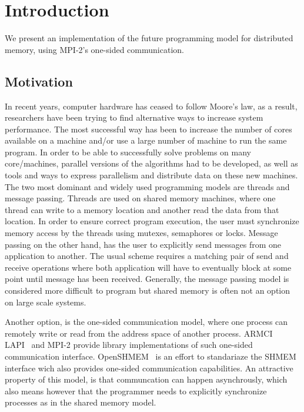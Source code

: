 \chapter{Introduction}
We present an implementation of the future programming model for distributed memory,
using MPI-2's one-sided communication.


\section{Motivation}
In recent years, computer hardware has ceased to follow Moore's law, as a result, researchers
have been trying to find alternative ways to increase system performance.  The most successful
way has been to increase the number of cores available on a machine and/or use a large number 
of machine to run the same program.  In order to be able to successfully solve problems on
many core/machines, parallel versions of the algorithms had to be developed, as well as tools
and ways to express parallelism and distribute data on these new machines.
The two most dominant and widely used programming models are threads and message passing.
Threads are used on shared memory machines, where one thread can write to a memory location
and another read the data from that location.  In order to ensure correct program execution,
the user must synchronize memory access by the threads using mutexes, semaphores or locks.
Message passing on the other hand, has the user to explicitly send messages from one
application to another.  The usual scheme requires a matching pair of send and receive operations
where both application will have to eventually block at some point until message has been received.
Generally, the message passing model is considered more difficult to program but shared memory is
often not an option on large scale systems.


Another option, is the one-sided communication model, where one process can remotely write
or read from the address space of another process.  ARMCI~\cite{Nieplocha99armci:a} 
LAPI~\cite{Shah:1998:PEL:876880.879642} and MPI-2 provide library implementations of such 
one-sided communication interface.  OpenSHMEM~\cite{Chapman:2010:IOS:2020373.2020375} is 
an effort to standariaze the SHMEM interface wich also provides one-sided communication
capabilities.  An attractive property of this model, is that communcation can happen 
asynchrously, which also means however that the programmer needs to explicitly synchronize
processes as in the shared memory model.


